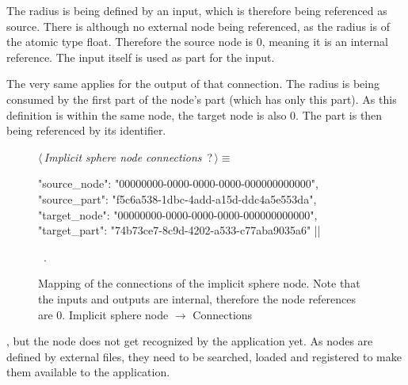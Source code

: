 \documentclass[%
    a4paper,    %
    justified,  %
    nobib,      %
    openany     %
]{tufte-book}
\makeatletter
\renewcommand{\label}[1]{\@tufte@label{##1}}%
\makeatother
\begin{document}
The radius is being defined by an input, which is therefore being referenced as
source. There is although no external node being referenced, as the radius is
of the atomic type float. Therefore the source node is 0, meaning it is an
internal reference. The input itself is used as part for the input.

The very same applies for the output of that connection. The radius is being
consumed by the first part of the node's part (which has only this part). As
this definition is within the same node, the target node is also 0. The part is
then being referenced by its identifier.

\begin{figure}
\begin{flushleft} \small
\begin{minipage}{\linewidth}\label{scrap105}\raggedright\small
{} $\langle\,${\itshape Implicit sphere node connections}\nobreak\ {\footnotesize {?}}$\,\rangle\equiv$
\vspace{-1ex}
\begin{pythoncode}
{
    "source_node": "00000000-0000-0000-0000-000000000000",
    "source_part": "f5c6a538-1dbc-4add-a15d-ddc4a5e553da",
    "target_node": "00000000-0000-0000-0000-000000000000",
    "target_part": "74b73ce7-8c9d-4202-a533-c77aba9035a6"
}|\NWsep|
\end{pythoncode}
\vspace{1.5ex}
\footnotesize
\begin{list}{}{\setlength{\itemsep}{-\parsep}\setlength{\itemindent}{-\leftmargin}}
\item \NWtxtMacroRefIn\ .

\item{}
\end{list}
\end{minipage}\vspace{4ex}
\end{flushleft}
\caption{Mapping of the connections of the implicit sphere node. Note that the
  inputs and outputs are internal, therefore the node references are 0.
  \newline{}\newline{}Implicit sphere node $\rightarrow$ Connections}
\label{editor:lst:nodes:sphere-node:connections}
\end{figure}

, but the node does not get
recognized by the application yet. As nodes are defined by external files, they
need to be searched, loaded and registered to make them available to the
application.
\end{document}
